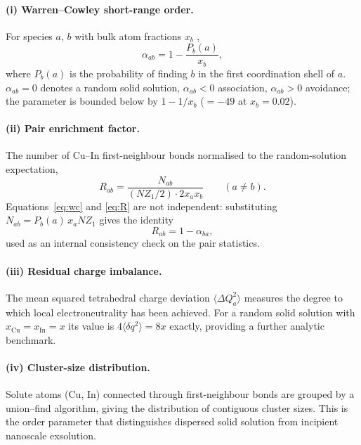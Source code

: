 \documentclass[11pt,a4paper]{article}
\newcommand{\dQ}{\Delta Q}
\begin{document}
\paragraph{(i) Warren--Cowley short-range order.}
For species $a$, $b$ with bulk atom fractions $x_b$ \citep{cowley1950},
\begin{equation}
\alpha_{ab} = 1 - \frac{P_b(a)}{x_b},
\label{eq:wc}
\end{equation}
where $P_b(a)$ is the probability of finding $b$ in the first coordination shell
of $a$. $\alpha_{ab} = 0$ denotes a random solid solution, $\alpha_{ab} < 0$
association, $\alpha_{ab} > 0$ avoidance; the parameter is bounded below by
$1 - 1/x_b$ ($= -49$ at $x_b = 0.02$).

\paragraph{(ii) Pair enrichment factor.}
The number of Cu--In first-neighbour bonds normalised to the random-solution
expectation,
\begin{equation}
R_{ab} = \frac{N_{ab}}{\left( N Z_1 / 2 \right) \cdot 2 x_a x_b} \qquad (a \neq b).
\label{eq:R}
\end{equation}
Equations~\eqref{eq:wc} and \eqref{eq:R} are not independent: substituting
$N_{ab} = P_b(a)\, x_a N Z_1$ gives the identity
\begin{equation}
R_{ab} = 1 - \alpha_{ba},
\label{eq:identity}
\end{equation}
used as an internal consistency check on the pair statistics.

\paragraph{(iii) Residual charge imbalance.}
The mean squared tetrahedral charge deviation $\langle \dQ_a^2 \rangle$ measures
the degree to which local electroneutrality has been achieved. For a random
solid solution with $x_{\mathrm{Cu}} = x_{\mathrm{In}} = x$ its value is
$4\langle \delta q^2\rangle = 8x$ exactly, providing a further analytic
benchmark.

\paragraph{(iv) Cluster-size distribution.}
Solute atoms (Cu, In) connected through first-neighbour bonds are grouped by a
union--find algorithm, giving the distribution of contiguous cluster sizes. This
is the order parameter that distinguishes dispersed solid solution from
incipient nanoscale exsolution.
\end{document}
